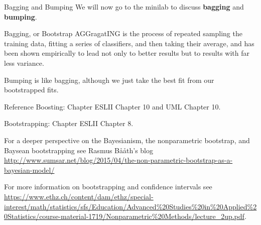 \documentclass[10pt, table, dvipsnames,xcdraw, handout]{beamer}
\begin{document}
\begin{frame}[fragile]{Bagging and Bumping}
We will now go to the minilab to discuss \textbf{bagging} and \textbf{bumping}. \pause

Bagging, or Bootstrap AGGragatING is the process of repeated sampling the training data, fitting a series of classifiers, and then taking their average, and has been shown empirically to lead not only to better results but to results with far less variance. \pause

Bumping is like bagging, although we just take the best fit from our bootstrapped fits. 
\end{frame}









\begin{frame}[fragile]{Reference}
Boosting: Chapter ESLII Chapter 10 and UML Chapter 10. 

Bootstrapping: Chapter ESLII Chapter 8. 

For a deeper perspective on the Bayesianism, the nonparametric bootstrap, and Baysean bootstrapping see Rasmus Bååth's blog \url{http://www.sumsar.net/blog/2015/04/the-non-parametric-bootstrap-as-a-bayesian-model/}

For more information on bootstrapping and confidence intervals see \url{https://www.ethz.ch/content/dam/ethz/special-interest/math/statistics/sfs/Education/Advanced%20Studies%20in%20Applied%20Statistics/course-material-1719/Nonparametric%20Methods/lecture_2up.pdf}.
\end{frame}
\end{document}
